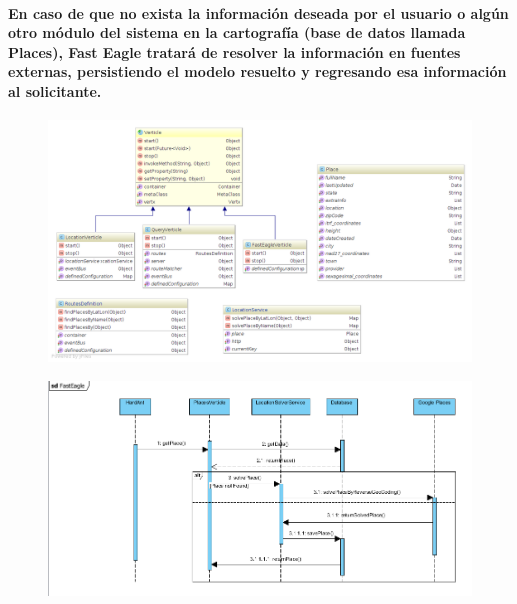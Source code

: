       \paragraph{En caso de que no exista la información deseada por el usuario o algún otro módulo del sistema en la cartografía (base de datos llamada Places), Fast Eagle tratará de resolver la información en fuentes externas, persistiendo el modelo resuelto y regresando esa información al solicitante.}
      \begin{figure}[h!]
          \centering
            \includegraphics[width=\textwidth]{./images/FastEagleClassDiagram}
      \end{figure}
      \begin{figure}[h!]
          \centering
            \includegraphics[width=\textwidth]{./images/FastEagleSequenceDiagram}
      \end{figure}
